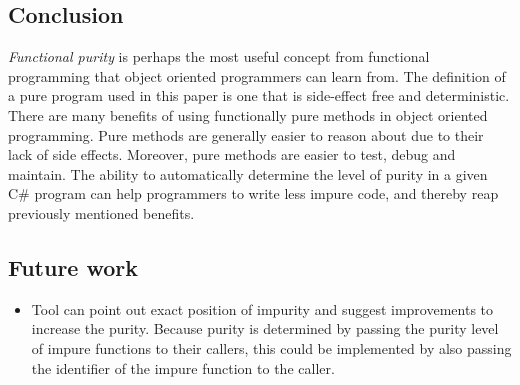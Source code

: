 \documentclass[a4paper,12pt]{article}
\begin{document}
\subsection{Conclusion} \label{sub:Conclusion}
\textit{Functional purity} is perhaps the most useful concept from functional programming that object oriented programmers can learn from. The definition of a pure program used in this paper is one that is side-effect free and deterministic. There are many benefits of using functionally pure methods in object oriented programming. Pure methods are generally easier to reason about due to their lack of side effects. Moreover, pure methods are easier to test, debug and maintain. The ability to automatically determine the level of purity in a given C\# program can help programmers to write less impure code, and thereby reap previously mentioned benefits.

\subsection{Future work} \label{sub:Future work}

\begin{itemize}
  \item Tool can point out exact position of impurity and suggest improvements to increase the purity. Because purity is determined by passing the purity level of impure functions to their callers, this could be implemented by also passing the identifier of the impure function to the caller.
\end{itemize}



\end{document}
